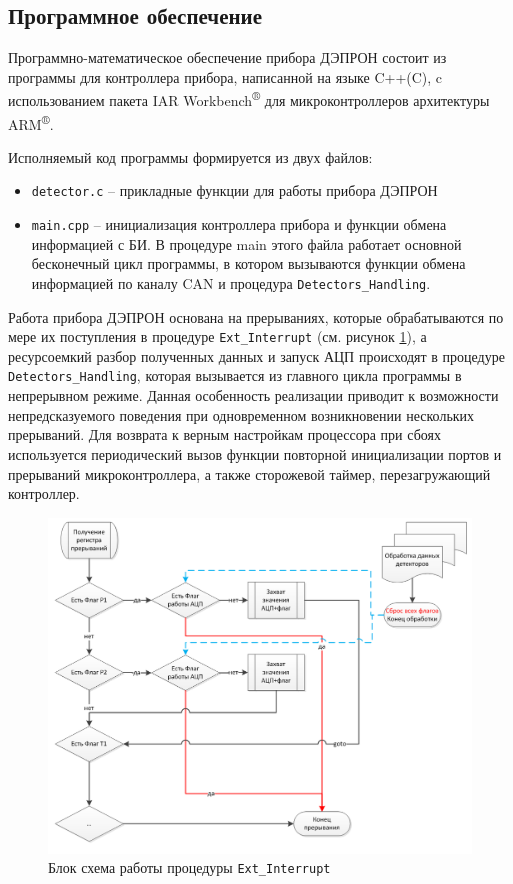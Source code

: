 \subsection{Программное обеспечение}

Программно-математическое обеспечение прибора ДЭПРОН состоит из программы для контроллера прибора, написанной на языке C++(C), c использованием пакета IAR  Workbench\textsuperscript{®} для микроконтроллеров архитектуры ARM\textsuperscript{®}. 


Исполняемый код программы формируется из двух файлов: 


\begin{itemize}
	\item 	\texttt{detector.c} -- прикладные функции для работы прибора ДЭПРОН
	
	
	\item \texttt{main.cpp} -- инициализация контроллера прибора и функции обмена информацией с БИ. В процедуре main этого файла работает основной бесконечный цикл программы, в котором вызываются функции обмена информацией по каналу CAN и процедура \texttt{Detectors\_Handling}.
	
	
\end{itemize}
Работа прибора ДЭПРОН основана на прерываниях, которые обрабатываются по мере их поступления в процедуре \texttt{Ext\_Interrupt} (см. рисунок \ref{fig:ext_interrupt}), а ресурсоемкий разбор полученных данных и запуск АЦП происходят в процедуре \texttt{Detectors\_Handling}, которая вызывается из главного цикла программы в непрерывном режиме. 
Данная особенность реализации приводит к возможности непредсказуемого поведения при одновременном возникновении нескольких прерываний. 
Для возврата к верным настройкам процессора при сбоях используется периодический вызов функции повторной инициализации портов и прерываний микроконтроллера, а также сторожевой таймер, перезагружающий контроллер.
\begin{figure}
\centering
\includegraphics[width=0.7\linewidth]{images/ext_interrupt}
\caption{Блок схема работы процедуры \texttt{Ext\_Interrupt}}
\label{fig:ext_interrupt}
\end{figure}

